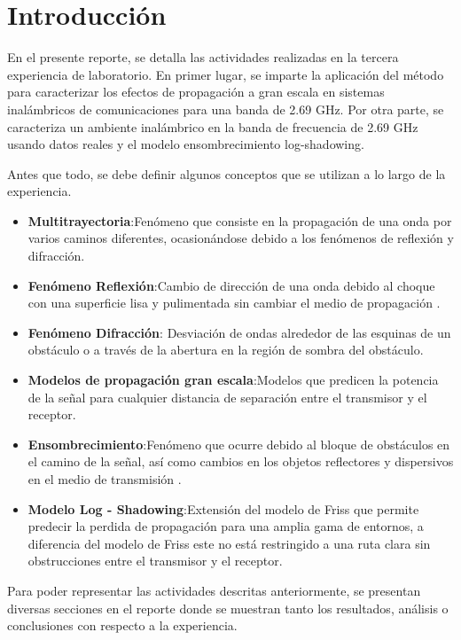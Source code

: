\section{Introducción}\label{sec:introducción}
En el presente reporte, se detalla las actividades realizadas en la tercera experiencia de laboratorio. En primer lugar, se imparte la aplicación del método para caracterizar los efectos de propagación a gran escala en sistemas inalámbricos de comunicaciones para una banda de 2.69 GHz. Por otra parte, se caracteriza un ambiente inalámbrico en la banda de frecuencia de 2.69 GHz usando datos reales y el modelo ensombrecimiento log-shadowing.

Antes que todo, se debe definir algunos conceptos que se utilizan a lo largo de la experiencia.

\begin{itemize}
    \item \textbf{Multitrayectoria}:Fenómeno que consiste en la propagación de una onda por varios caminos diferentes, ocasionándose debido a los fenómenos de reflexión y difracción\cite{multi}.
   \item \textbf{Fenómeno Reflexión}:Cambio de dirección de una onda debido al choque con una superficie lisa y pulimentada sin cambiar el medio de propagación \cite{efect}.
   \item \textbf{Fenómeno Difracción}: Desviación de ondas alrededor de las esquinas de un obstáculo o a través de la abertura en la región de sombra del obstáculo\cite{efect}.
    \item \textbf{Modelos de propagación gran escala}:Modelos que predicen la potencia de la señal para cualquier distancia de separación entre el transmisor y el receptor.
      \item \textbf{Ensombrecimiento}:Fenómeno que ocurre debido al bloque de obstáculos en el camino de la señal, así como cambios en los objetos reflectores y dispersivos en el medio de transmisión \cite{shadow}.
      \item\textbf{Modelo Log - Shadowing}:Extensión del modelo de Friss que permite predecir la perdida de propagación para una amplia gama de entornos, a diferencia del modelo de Friss este no está restringido a una ruta clara sin obstrucciones entre el transmisor y el receptor\cite{tabla}.
    
\end{itemize}



Para poder representar las actividades descritas anteriormente, se presentan diversas secciones en el reporte donde se muestran tanto los resultados, análisis o conclusiones con respecto a la experiencia.